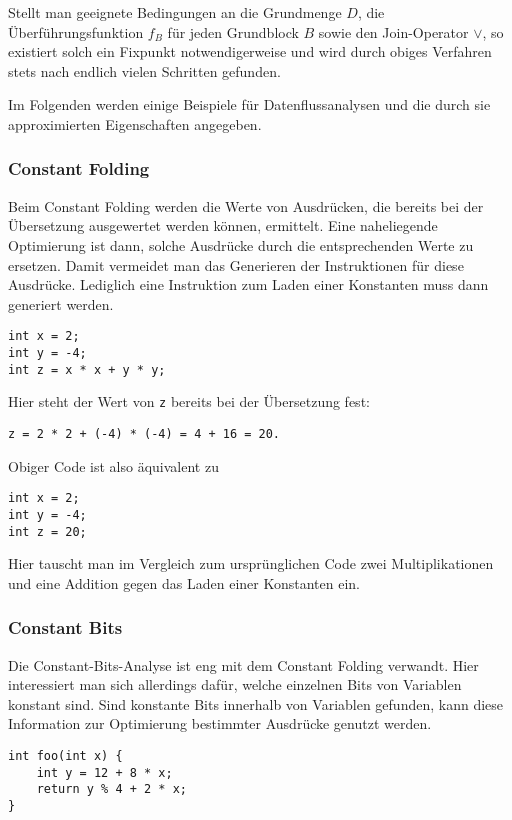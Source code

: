 Stellt man geeignete Bedingungen an die Grundmenge $D$, die Überführungsfunktion $f_B$ für jeden Grundblock $B$ sowie den Join-Operator $\vee$, so existiert solch ein Fixpunkt notwendigerweise und wird durch obiges Verfahren stets nach endlich vielen Schritten gefunden.


Im Folgenden werden einige Beispiele für Datenflussanalysen und die durch sie approximierten Eigenschaften angegeben.

\subsubsection{Constant Folding}
Beim Constant Folding werden die Werte von Ausdrücken, die bereits bei der Übersetzung ausgewertet werden können, ermittelt.
Eine naheliegende Optimierung ist dann, solche Ausdrücke durch die entsprechenden Werte zu ersetzen.
Damit vermeidet man das Generieren der Instruktionen für diese Ausdrücke. Lediglich eine Instruktion zum Laden einer Konstanten muss dann generiert werden.
\begin{lstlisting}[frame=single, captionpos=b, caption=Beispielcode für Constant-Folding-Analyse]
int x = 2;
int y = -4;
int z = x * x + y * y; 
\end{lstlisting}
Hier steht der Wert von \lstinline{z} bereits bei der Übersetzung fest:
\begin{lstlisting}[numbers=none]
z = 2 * 2 + (-4) * (-4) = 4 + 16 = 20.
\end{lstlisting}
Obiger Code ist also äquivalent zu
\begin{lstlisting}[frame=single, captionpos=b, caption=Mittels Constant-Folding optimierte Version von Listing 2]
int x = 2;
int y = -4;
int z = 20; 
\end{lstlisting}
Hier tauscht man im Vergleich zum ursprünglichen Code zwei Multiplikationen und eine Addition gegen das Laden einer Konstanten ein.

\subsubsection{Constant Bits}
Die Constant-Bits-Analyse ist eng mit dem Constant Folding verwandt. 
Hier interessiert man sich allerdings dafür, welche einzelnen Bits von Variablen konstant sind.
Sind konstante Bits innerhalb von Variablen gefunden, kann diese Information zur Optimierung bestimmter Ausdrücke genutzt werden.

\par

\begin{lstlisting}[frame=single, captionpos=b, caption=Beispielcode für Constant-Bits-Analyse]
int foo(int x) {
	int y = 12 + 8 * x;
	return y % 4 + 2 * x;
} 
\end{lstlisting}


